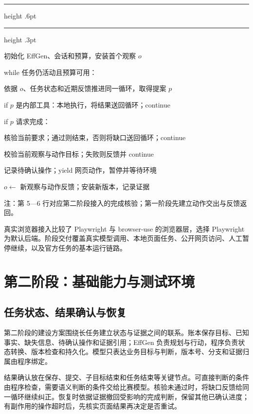 \documentclass[UTF8,zihao=5,fontset=windows,a4paper]{ctexart}
\newcommand{\kw}[1]{\textsf{\color{navy}#1}}
\newcommand{\algline}[2]{\makebox[1.4em][r]{\scriptsize\color{muted}#1}\hspace{0.7em}#2\par}
\begin{document}
\begin{algorithm}[htbp]
{\color{blue}\hrule height .6pt}
\caption{可暂停的观察—动作循环}\label{alg:loop}
{\color{rulegray}\hrule height .3pt}
\vspace{6pt}
\begingroup
\small\setlength{\parindent}{0pt}\setlength{\parskip}{3pt}
\algline{1}{初始化 EffGen、会话和预算，安装首个观察 $o$}
\algline{2}{\kw{while} 任务仍活动且预算可用：}
\algline{3}{\hspace*{1.3em}依据 $o$、任务状态和近期反馈推进同一循环，取得提案 $p$}
\algline{4}{\hspace*{1.3em}\kw{if} $p$ 是内部工具：本地执行，将结果送回循环；\kw{continue}}
\algline{5}{\hspace*{1.3em}\kw{if} $p$ 请求完成：}
\algline{6}{\hspace*{2.6em}核验当前要求；通过则结束，否则将缺口送回循环；\kw{continue}}
\algline{7}{\hspace*{1.3em}校验当前观察与动作目标；失败则反馈并 \kw{continue}}
\algline{8}{\hspace*{1.3em}记录待确认操作；\kw{yield} 网页动作，暂停并等待环境}
\algline{9}{\hspace*{1.3em}$o \leftarrow$ 新观察与动作反馈；安装新版本，记录证据}
\endgroup
\vspace{2pt}
\noindent{\color{rulegray}\rule{\linewidth}{.4pt}}\par
{\footnotesize 注：第 5—6 行对应第二阶段接入的完成核验；第一阶段先建立动作交出与反馈返回。}
\end{algorithm}

\vspace{7pt}
真实浏览器接入比较了 Playwright 与 browser-use 的浏览器层，选择 Playwright 为默认后端。阶段交付覆盖真实模型调用、本地页面任务、公开网页访问、人工暂停继续，以及官方任务的基本运行链路。

\section{第二阶段：基础能力与测试环境}
\subsection{任务状态、结果确认与恢复}
第二阶段的建设方案围绕长任务建立状态与证据之间的联系。账本保存目标、已知事实、缺失信息、待确认操作和证据引用；EffGen 负责规划与行动，程序负责状态转换、版本检查和持久化。模型只表达业务目标与判断，版本号、分支和证据归属由程序绑定。

结果确认放在保存、提交、子目标结束和任务结束等关键节点。可直接判断的条件由程序检查，需要语义判断的条件交给比赛模型。核验未通过时，将缺口反馈给同一循环继续纠正。恢复时依据证据撤回受影响的完成判断，保留其他已确认进度；有副作用的操作超时后，先核实页面结果再决定是否重试。
\end{document}
